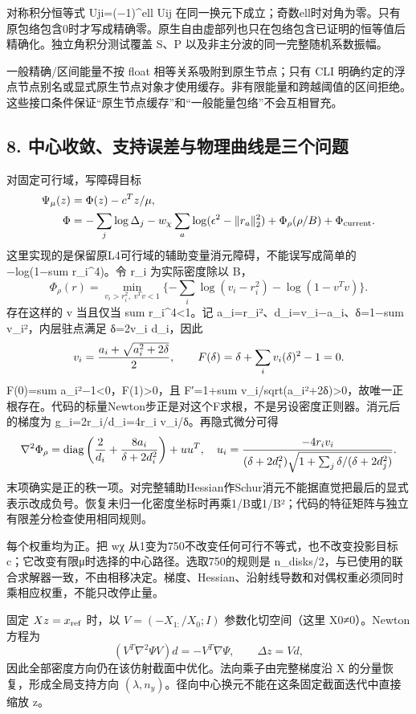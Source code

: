 \documentclass[
  11pt,
  a4paper,
]{article}
\begin{document}
对称积分恒等式 Uji=(−1)\^{}ell Uij
在同一换元下成立；奇数ell时对角为零。只有原包络包含0时才写成精确零。原生自由虚部列也只在包络包含已证明的恒等值后精确化。独立角积分测试覆盖
S、P 以及非主分波的同一完整随机系数振幅。

一般精确/区间能量不按 float 相等关系吸附到原生节点；只有 CLI
明确约定的浮点节点别名或显式原生节点对象才使用缓存。非有限能量和跨越阈值的区间拒绝。这些接口条件保证``原生节点缓存''和``一般能量包络''不会互相冒充。

\subsection{8.
中心收敛、支持误差与物理曲线是三个问题}\label{ux4e2dux5fc3ux6536ux655bux652fux6301ux8befux5deeux4e0eux7269ux7406ux66f2ux7ebfux662fux4e09ux4e2aux95eeux9898}

对固定可行域，写障碍目标 \[
\begin{aligned}
\Psi_\mu(z)&=\Phi(z)-c^Tz/\mu,\\
\Phi&=-\sum_j\log\Delta_j-w_\chi\sum_a\log(\epsilon^2-\|r_a\|_2^2)
+\Phi_\rho(\rho/B)+\Phi_{\rm current}.
\end{aligned}
\] 这里实现的是保留原L4可行域的辅助变量消元障碍，不能误写成简单的
−log(1−sum r\_i\^{}4)。令 r\_i 为实际密度除以 B， \[
\Phi_\rho(r)=\min_{v_i>r_i^2,\;v^Tv<1}
\{-\sum_i\log(v_i-r_i^2)-\log(1-v^Tv)\}.
\] 存在这样的 v 当且仅当 sum r\_i\^{}4\textless1。记
a\_i=r\_i²、d\_i=v\_i−a\_i、δ=1−sum v\_i²，内层驻点满足 δ=2v\_i
d\_i，因此 \[
v_i={a_i+\sqrt{a_i^2+2\delta}\over2},\qquad
F(\delta)=\delta+\sum_i v_i(\delta)^2-1=0.
\] F(0)=sum a\_i²−1\textless0，F(1)\textgreater0，且 F′=1+sum
v\_i/sqrt(a\_i²+2δ)\textgreater0，故唯一正根存在。代码的标量Newton步正是对这个F求根，不是另设密度正则器。消元后的梯度为
g\_i=2r\_i/d\_i=4r\_i v\_i/δ。再隐式微分可得 \[
\nabla^2\Phi_\rho=\operatorname{diag}
\left({2\over d_i}+{8a_i\over\delta+2d_i^2}\right)+uu^T,
\quad
u_i={-4r_i v_i\over(\delta+2d_i^2)\sqrt{1+\sum_j\delta/(\delta+2d_j^2)}}.
\]
末项确实是正的秩一项。对完整辅助Hessian作Schur消元不能据直觉把最后的显式表示改成负号。恢复未归一化密度坐标时再乘1/B或1/B²；代码的特征矩阵与独立有限差分检查使用相同规则。

每个权重均为正。把 wχ 从1变为750不改变任何可行不等式，也不改变投影目标
c；它改变有限μ时选择的中心路径。选取750的规则是
n\_disks/2，与已使用的联合求解器一致，不由相移决定。梯度、Hessian、沿射线导数和对偶权重必须同时乘相应权重，不能只改停止量。

固定 \(Xz=x_{\rm ref}\) 时，以 \(V=(-X_{1:}/X_0;I)\) 参数化切空间（这里
X0≠0）。Newton 方程为 \[
(V^T\nabla^2\Psi V)d=-V^T\nabla\Psi,
\qquad \Delta z=Vd,
\] 因此全部密度方向仍在该仿射截面中优化。法向乘子由完整梯度沿 X
的分量恢复，形成全局支持方向
\((\lambda,n_y)\)。径向中心换元不能在这条固定截面迭代中直接缩放 z。
\end{document}
